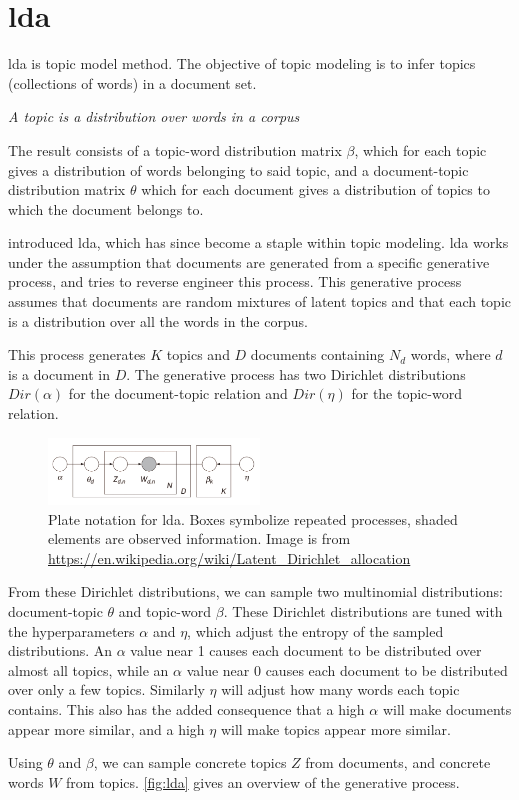 \section{\acrlong{lda}}\label{sec:lda}
\Gls{lda} is topic model method. The objective of topic modeling is to infer topics (collections of words) in a document set.

\begin{definition}\label{def:topic}
	\textit{A topic is a distribution over words in a corpus}
\end{definition}

The result consists of a topic-word distribution matrix $\beta$, which for each topic gives a distribution of words belonging to said topic, and a document-topic distribution matrix $\theta$ which for each document gives a distribution of topics to which the document belongs to.

\citeauthor{lda} \cite{lda} introduced \gls{lda}, which has since become a staple within topic modeling.
\gls{lda} works under the assumption that documents are generated from a specific generative process, and tries to reverse engineer this process.
This generative process assumes that documents are random mixtures of latent topics and that each topic is a distribution over all the words in the corpus.

This process generates $K$ topics and $D$ documents containing $N_{d}$ words, where $d$ is a document in $D$.
The generative process has two Dirichlet distributions $Dir(\alpha)$ for the document-topic relation and $Dir(\eta)$ for the topic-word relation.

\begin{figure}[h]
	\centering
	\includegraphics[width=0.5\textwidth]{figures/Smoothed_LDA.jpg}
	\caption{Plate notation for \gls{lda}. Boxes symbolize repeated processes, shaded elements are observed information. Image is from \url{https://en.wikipedia.org/wiki/Latent_Dirichlet_allocation}}
	\label{fig:lda}
\end{figure}
From these Dirichlet distributions, we can sample two multinomial distributions: document-topic $\theta$ and topic-word $\beta$.
These Dirichlet distributions are tuned with the hyperparameters $\alpha$ and $\eta$, which adjust the entropy of the sampled distributions.
An $\alpha$ value near 1 causes each document to be distributed over almost all topics, while an $\alpha$ value near 0 causes each document to be distributed over only a few topics.
Similarly $\eta$ will adjust how many words each topic contains.
This also has the added consequence that a high $\alpha$ will make documents appear more similar, and a high $\eta$ will make topics appear more similar.

Using $\theta$ and $\beta$, we can sample concrete topics $Z$ from documents, and concrete words $W$ from topics.
\autoref{fig:lda} gives an overview of the generative process.

